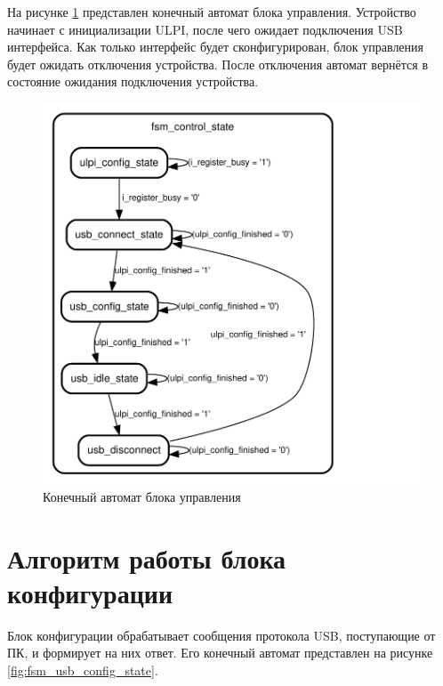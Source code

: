 На рисунке \ref{fig:fsm_control_state} представлен конечный автомат блока управления. Устройство начинает с инициализации ULPI, после чего ожидает подключения USB интерфейса. Как только интерфейс будет сконфигурирован, блок управления будет ожидать отключения устройства. После отключения автомат вернётся в состояние ожидания подключения устройства.

\begin{figure}[ht]
    \centering
    \includegraphics[scale=1]{res/img/fsm_control_state.pdf}
    \caption{Конечный автомат блока управления}
    \label{fig:fsm_control_state}
\end{figure}

\section{Алгоритм работы блока конфигурации}

Блок конфигурации обрабатывает сообщения протокола USB, поступающие от ПК, и формирует на них ответ. Его конечный автомат представлен на рисунке \ref{fig:fsm_usb_config_state}.


